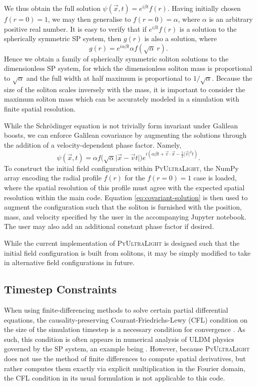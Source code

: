 \documentclass[a4paper,11pt]{article}
\newcommand{\PyUltraLight}{\textsc{PyUltraLight}\xspace}
\begin{document}
We thus obtain the full solution $\psi(\vec{x},t)=e^{i\beta t}f(r)$.
Having initially chosen $f(r=0)=1$, we may then generalise to $f(r=0)=\alpha$, where $\alpha$ is an arbitrary positive real number. It is easy to verify that if $e^{i\beta t}f(r)$ is a solution to the spherically symmetric SP system, then $g(r)$ is also a solution, where
\begin{equation}
    g(r)=e^{i\alpha\beta t}\alpha f(\sqrt{\alpha}\ r).
\end{equation}
Hence we obtain a family of spherically symmetric soliton solutions to the dimensionless SP system, for which the dimensionless soliton mass is proportional to $\sqrt{\alpha}$ and the full width at half maximum is proportional to $1/\sqrt{\alpha}$. Because the size of the soliton scales inversely with the mass, it is important to consider the maximum soliton mass which can be accurately modeled in a simulation with finite spatial resolution. 

While the Schr{\"o}dinger equation is not trivially form invariant under Galilean boosts, we can enforce Galilean covariance by augmenting the solutions through the addition of a velocity-dependent phase factor. Namely,
\begin{equation}\label{eq:covariant-solution}
    \psi(\vec{x},t)=\alpha f\big(\sqrt{\alpha}\vert\vec{x}-\vec{v}t\vert\big)e^{i\left(\alpha\beta t+\vec{v}\cdot\vec{x}-\frac{1}{2}\vert\vec{v}\vert^2t\right)}.
\end{equation}
To construct the initial field configuration within \PyUltraLight, the NumPy array encoding the radial profile $f(r)$ for the $f(r=0)=1$ case is loaded, where the spatial resolution of this profile must agree with the expected spatial resolution within the main code. Equation \ref{eq:covariant-solution} is then used to augment the configuration such that the soliton is furnished with the position, mass, and velocity specified by the user in the accompanying Jupyter notebook. The user may also add an additional constant phase factor if desired.

While the current implementation of \PyUltraLight is designed such that the initial field configuration is built from solitons, it may be simply modified to take in alternative field configurations in future.  

\subsection{Timestep Constraints}

When using finite-differencing methods to solve certain partial differential equations, the causality-preserving Courant-Friedrichs-Lewy (CFL) condition on the size of the simulation timestep is a necessary condition for convergence \cite{Ajaib2013}. As such, this condition is often appears in numerical analysis of ULDM physics governed by the SP system, an example being \cite{Schwabe2016}. However, because \PyUltraLight does not use the method of finite differences to compute spatial derivatives, but rather computes them exactly via explicit multiplication in the Fourier domain, the CFL condition in its usual formulation is not applicable to this code. 
\end{document}
